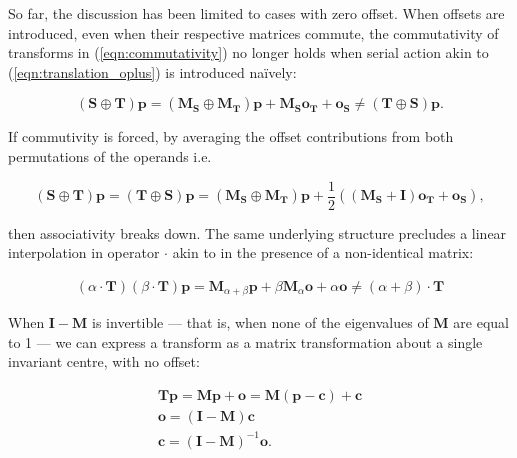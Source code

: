 		    So far, the discussion has been limited to cases with zero offset. When offsets are introduced, even when their respective matrices commute, the commutativity of transforms in (\ref{eqn:commutativity}) no longer holds when serial action akin to (\ref{eqn:translation_oplus}) is introduced na\"ively:
		    
        \begin{equation}
          (\mathbf{S} \oplus \mathbf{T})\mathbf{p} = (\mathbf{M_S} \oplus \mathbf{M_T})\mathbf{p} + \mathbf{M_So_T} + \mathbf{o_S} \ne (\mathbf{T} \oplus \mathbf{S})\mathbf{p}.
        \end{equation}
        
        If commutivity is forced, by averaging the offset contributions from both permutations of the operands i.e.
        
        \begin{equation}
          (\mathbf{S} \oplus \mathbf{T})\mathbf{p} = (\mathbf{T} \oplus \mathbf{S})\mathbf{p} = (\mathbf{M_S} \oplus \mathbf{M_T})\mathbf{p} + \frac{1}{2}\left(\left( \mathbf{M_S} + \mathbf{I} \right) \mathbf{o_T} + \mathbf{o_S}\right),
        \end{equation}
        
        then associativity breaks down. The same underlying structure precludes a linear interpolation in operator $\cdot$ akin to  in the presence of a non-identical matrix:
        
        \begin{gather}
          (\alpha \cdot \mathbf{T})(\beta \cdot \mathbf{T})\mathbf{p} = \mathbf{M}_{\alpha+\beta}\mathbf{p} + \beta\mathbf{M}_{\alpha}\mathbf{o} + \alpha\mathbf{o} \ne (\alpha + \beta) \cdot \mathbf{T}
        \end{gather}
        
        When $\mathbf{I} - \mathbf{M}$ is invertible --- that is, when none of the eigenvalues of $\mathbf{M}$ are equal to 1 --- we can express a transform as a matrix transformation about a single invariant centre, with no offset:
        
        \begin{gather}
          \mathbf{Tp} = \mathbf{Mp} + \mathbf{o} = \mathbf{M}(\mathbf{p}-\mathbf{c}) + \mathbf{c} \\
          \mathbf{o} = (\mathbf{I} - \mathbf{M})\mathbf{c} \\
          \mathbf{c} = (\mathbf{I} - \mathbf{M})^{-1}\mathbf{o}.
        \end{gather}
        
